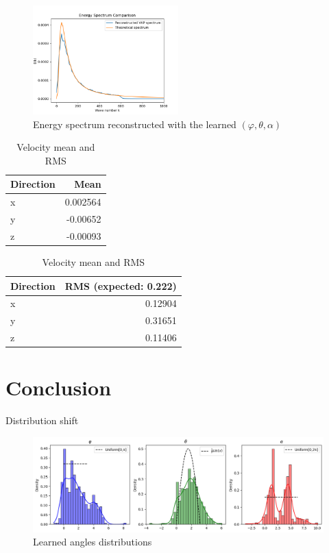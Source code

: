 \documentclass[11pt]{beamer}
\begin{document}
\begin{frame}
  \begin{figure}
    \centering
    \includegraphics[width=0.5\textwidth]{illustrations/Energy_Spectrum_VKP.png}
    \caption{Energy spectrum reconstructed with the learned $(\varphi,\theta,\alpha)$}
  \end{figure}

   \begin{table}
    \centering
    \begin{tabular}{lr}
      \toprule
      \textbf{Direction} & \textbf{Mean} \\
      \midrule
      x & 0.002564 \\
      y & -0.00652 \\
      z & -0.00093 \\
      \bottomrule
    \end{tabular}
    \qquad
    \begin{tabular}{lr}
      \toprule
      \textbf{Direction} & \textbf{RMS (expected: 0.222)} \\
      \midrule
      x & 0.12904 \\
      y & 0.31651 \\
      z & 0.11406 \\
      \bottomrule
    \end{tabular}
    \caption{Velocity mean and RMS}
  \end{table}
\end{frame}


\section{Conclusion}

\begin{frame}{Distribution shift}
    \begin{figure}
        \centering
        \includegraphics[width=1\linewidth]{illustrations/AnglesDistributionLearned.png}
        \caption{Learned angles distributions}
    \end{figure}
\end{frame}
\end{document}

